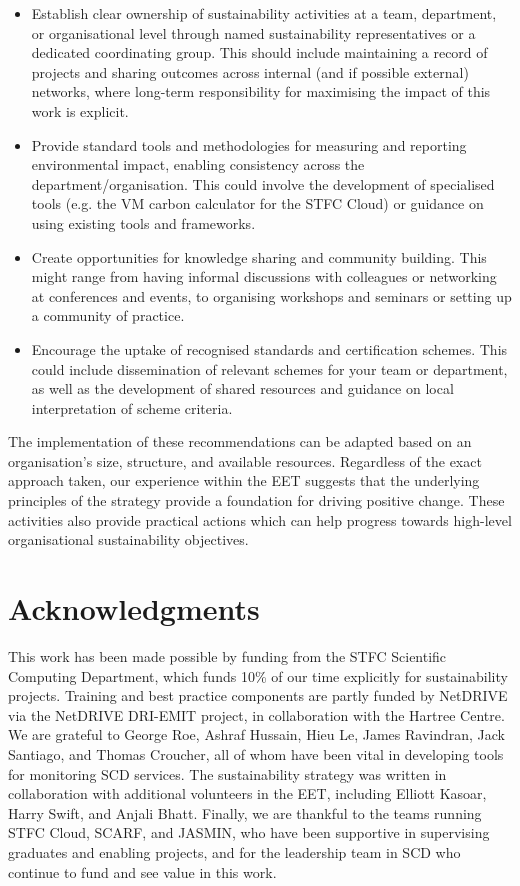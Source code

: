 \documentclass[sigconf]{acmart}
\begin{document}
\begin{itemize}
    \item Establish clear ownership of sustainability activities at a team, department, or organisational level through named sustainability representatives or a dedicated coordinating group. This should include maintaining a record of projects and sharing outcomes across internal (and if possible external) networks, where long-term responsibility for maximising the impact of this work is explicit.
    \item Provide standard tools and methodologies for measuring and reporting environmental impact, enabling consistency across the department/organisation. This could involve the development of specialised tools (e.g. the VM carbon calculator for the STFC Cloud) or guidance on using existing tools and frameworks.
    \item Create opportunities for knowledge sharing and community building. This might range from having informal discussions with colleagues or networking at conferences and events, to organising workshops and seminars or setting up a community of practice.
    \item Encourage the uptake of recognised standards and certification schemes. This could include dissemination of relevant schemes for your team or department, as well as the development of shared resources and guidance on local interpretation of scheme criteria.
\end{itemize}

The implementation of these recommendations can be adapted based on an organisation's size, structure, and available resources. Regardless of the exact approach taken, our experience within the EET suggests that the underlying principles of the strategy provide a foundation for driving positive change. These activities also provide practical actions which can help progress towards high-level organisational sustainability objectives.

 \section{Acknowledgments}

 This work has been made possible by funding from the STFC Scientific Computing Department, which funds 10\% of our time explicitly for sustainability projects. Training and best practice components are partly funded by NetDRIVE via the NetDRIVE DRI-EMIT project, in collaboration with the Hartree Centre. We are grateful to George Roe, Ashraf Hussain, Hieu Le, James Ravindran, Jack Santiago, and Thomas Croucher, all of whom have been vital in developing tools for monitoring SCD services. The sustainability strategy was written in collaboration with additional volunteers in the EET, including Elliott Kasoar, Harry Swift, and Anjali Bhatt. Finally, we are thankful to the teams running STFC Cloud, SCARF, and JASMIN, who have been supportive in supervising graduates and enabling projects, and for the leadership team in SCD who continue to fund and see value in this work.



\end{document}
